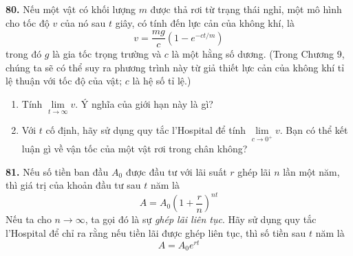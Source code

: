 \begin{minipage}[t]{0.485\textwidth}
\vspace{5pt}
\noindent
\textbf{80.} Nếu một vật có khối lượng $m$ được thả rơi từ trạng thái nghỉ, một mô hình cho tốc độ $v$ của nó sau $t$ giây, có tính đến lực cản của không khí, là
\[
v = \frac{mg}{c} \left(1 - e^{-ct/m}\right)
\]
trong đó $g$ là gia tốc trọng trường và $c$ là một hằng số dương. (Trong Chương 9, chúng ta sẽ có thể suy ra phương trình này từ giả thiết lực cản của không khí tỉ lệ thuận với tốc độ của vật; $c$ là hệ số tỉ lệ.)
\begin{enumerate}[label=(\alph*), leftmargin=1.5em, itemsep=1.5pt, topsep=2pt]
  \item Tính $\lim\limits_{t \to \infty} v$. Ý nghĩa của giới hạn này là gì?
  \item Với $t$ cố định, hãy sử dụng quy tắc l'Hospital để tính $\lim\limits_{c \to 0^+} v$. Bạn có thể kết luận gì về vận tốc của một vật rơi trong chân không?
\end{enumerate}

\vspace{5pt}
\noindent
\textbf{81.} Nếu số tiền ban đầu $A_0$ được đầu tư với lãi suất $r$ ghép lãi $n$ lần một năm, thì giá trị của khoản đầu tư sau $t$ năm là
\[
A = A_0 \left(1 + \frac{r}{n}\right)^{nt}
\]
Nếu ta cho $n \to \infty$, ta gọi đó là sự \textit{ghép lãi liên tục}. Hãy sử dụng quy tắc l'Hospital để chỉ ra rằng nếu tiền lãi được ghép liên tục, thì số tiền sau $t$ năm là
\[
A = A_0 e^{rt}
\]
\end{minipage}

